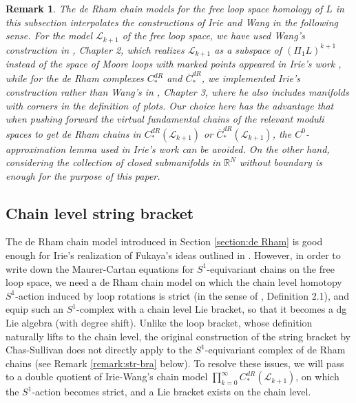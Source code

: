 \documentclass[a4paper]{article}
\newtheorem{remark}[theorem]{Remark}
\numberwithin{equation}{section}
\begin{document}
\begin{remark}\label{remark:model}
The de Rham chain models for the free loop space homology of $L$ in this subsection interpolates the constructions of Irie \cite{ki1} and Wang \cite{ywt} in the following sense. For the model $\mathcal{L}_{k+1}$ of the free loop space, we have used Wang's construction in \cite{ywt}, Chapter 2, which realizes $\mathcal{L}_{k+1}$ as a subspace of $(\Pi_1L)^{k+1}$ instead of the space of Moore loops with marked points appeared in Irie's work \cite{ki2}, while for the de Rham complexes $C_\ast^\mathit{dR}$ and $\overline{C}_\ast^\mathit{dR}$, we implemented Irie's construction \cite{ki1} rather than Wang's in \cite{ywt}, Chapter 3, where he also includes manifolds with corners in the definition of plots. Our choice here has the advantage that when pushing forward the virtual fundamental chains of the relevant moduli spaces to get de Rham chains in $C_\ast^\mathit{dR}(\mathcal{L}_{k+1})$ or $\overline{C}_\ast^\mathit{dR}(\mathcal{L}_{k+1})$, the $C^0$-approximation lemma used in Irie's work \cite{ki2} can be avoided. On the other hand, considering the collection of closed submanifolds in $\mathbb{R}^N$ without boundary is enough for the purpose of this paper.
\end{remark}

\subsection{Chain level string bracket}\label{section:BV}

The de Rham chain model introduced in Section \ref{section:de Rham} is good enough for Irie's realization of Fukaya's ideas outlined in \cite{kf}. However, in order to write down the Maurer-Cartan equations for $S^1$-equivariant chains on the free loop space, we need a de Rham chain model on which the chain level homotopy $S^1$-action induced by loop rotations is strict (in the sense of \cite{sg1}, Definition 2.1), and equip such an $S^1$-complex with a chain level Lie bracket, so that it becomes a dg Lie algebra (with degree shift). Unlike the loop bracket, whose definition naturally lifts to the chain level, the original construction of the string bracket by Chas-Sullivan \cite{cs} does not directly apply to the $S^1$-equivariant complex of de Rham chains (see Remark \ref{remark:str-bra} below). To resolve these issues, we will pass to a double quotient of Irie-Wang's chain model $\prod_{k=0}^\infty C_\ast^\mathit{dR}(\mathcal{L}_{k+1})$, on which the $S^1$-action becomes strict, and a Lie bracket exists on the chain level.
\end{document}
